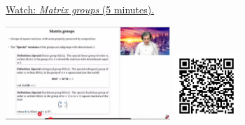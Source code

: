 
\begin{minipage}{10cm}
    \href{https://act4e-spring21.netlify.app/videos/spring2021-actions:matrix-groups.html}{Watch: \emph{Matrix groups} (5 minutes).}
        
    \href{https://act4e-spring21.netlify.app/videos/spring2021-actions:matrix-groups.html}{\includegraphics[height=3.5cm]{spring2021-actions:matrix-groups/thumbnails.jpg}}
    \href{https://act4e-spring21.netlify.app/videos/spring2021-actions:matrix-groups.html}{\includegraphics[height=2.5cm]{spring2021-actions:matrix-groups/qrcode.png}}
\end{minipage}
